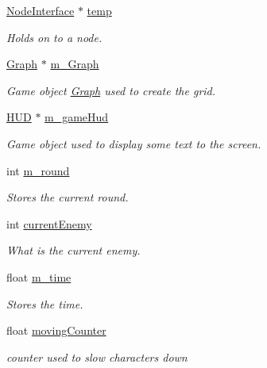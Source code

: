 \begin{DoxyCompactItemize}
\mbox{\hyperlink{class_node_interface}{Node\+Interface}} $\ast$ \mbox{\hyperlink{class_scene_af60873fd6cdd2e5c28ab765866d048f5}{temp}}
\begin{DoxyCompactList}\small\item\em Holds on to a node. \end{DoxyCompactList}\item 
\mbox{\label{class_scene_a4d3a38106693ded1bbdc4bc850711bc0}} 
\mbox{\hyperlink{class_graph}{Graph}} $\ast$ \mbox{\hyperlink{class_scene_a4d3a38106693ded1bbdc4bc850711bc0}{m\+\_\+\+Graph}}
\begin{DoxyCompactList}\small\item\em Game object \mbox{\hyperlink{class_graph}{Graph}} used to create the grid. \end{DoxyCompactList}\item 
\mbox{\label{class_scene_afb32c22792c8aeb990d043e3abd79c7e}} 
\mbox{\hyperlink{class_h_u_d}{H\+UD}} $\ast$ \mbox{\hyperlink{class_scene_afb32c22792c8aeb990d043e3abd79c7e}{m\+\_\+game\+Hud}}
\begin{DoxyCompactList}\small\item\em Game object used to display some text to the screen. \end{DoxyCompactList}\item 
\mbox{\label{class_scene_afbc60d92daf6a7ce27403484313b1dcb}} 
int \mbox{\hyperlink{class_scene_afbc60d92daf6a7ce27403484313b1dcb}{m\+\_\+round}}
\begin{DoxyCompactList}\small\item\em Stores the current round. \end{DoxyCompactList}\item 
\mbox{\label{class_scene_a6aaf00569c8fb13c0f970effb31ad340}} 
int \mbox{\hyperlink{class_scene_a6aaf00569c8fb13c0f970effb31ad340}{current\+Enemy}}
\begin{DoxyCompactList}\small\item\em What is the current enemy. \end{DoxyCompactList}\item 
\mbox{\label{class_scene_a082957d9d74447aa8acbb7192074510e}} 
float \mbox{\hyperlink{class_scene_a082957d9d74447aa8acbb7192074510e}{m\+\_\+time}}
\begin{DoxyCompactList}\small\item\em Stores the time. \end{DoxyCompactList}\item 
\mbox{\label{class_scene_a39f11954b4d7250aeedc2a60e78fbb18}} 
float \mbox{\hyperlink{class_scene_a39f11954b4d7250aeedc2a60e78fbb18}{moving\+Counter}}
\begin{DoxyCompactList}\small\item\em counter used to slow characters down \end{DoxyCompactList}\end{DoxyCompactItemize}
